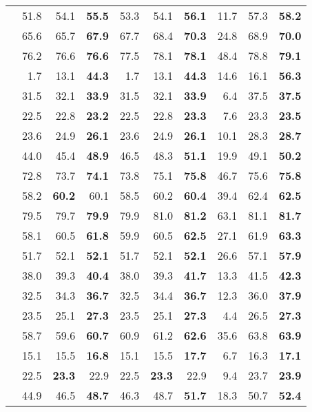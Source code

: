 \begin{table*}[p]
\begin{tabular}{lRRRRRRRRR}
     & 51.8 & 54.1 & \bf{55.5} & 53.3 & 54.1 & \bf{56.1} & 11.7 & 57.3 & \bf{58.2}\\
     & 65.6 & 65.7 & \bf{67.9} & 67.7 & 68.4 & \bf{70.3} & 24.8 & 68.9 & \bf{70.0}\\
     & 76.2 & 76.6 & \bf{76.6} & 77.5 & 78.1 & \bf{78.1} & 48.4 & 78.8 & \bf{79.1}\\
     & 1.7 & 13.1 & \bf{44.3} & 1.7 & 13.1 & \bf{44.3} & 14.6 & 16.1 & \bf{56.3}\\
     & 31.5 & 32.1 & \bf{33.9} & 31.5 & 32.1 & \bf{33.9} & 6.4 & 37.5 & \bf{37.5}\\
     & 22.5 & 22.8 & \bf{23.2} & 22.5 & 22.8 & \bf{23.3} & 7.6 & 23.3 & \bf{23.5}\\
     & 23.6 & 24.9 & \bf{26.1} & 23.6 & 24.9 & \bf{26.1} & 10.1 & 28.3 & \bf{28.7}\\
     & 44.0 & 45.4 & \bf{48.9} & 46.5 & 48.3 & \bf{51.1} & 19.9 & 49.1 & \bf{50.2}\\
     & 72.8 & 73.7 & \bf{74.1} & 73.8 & 75.1 & \bf{75.8} & 46.7 & 75.6 & \bf{75.8}\\
     & 58.2 & \bf{60.2} & 60.1 & 58.5 & 60.2 & \bf{60.4} & 39.4 & 62.4 & \bf{62.5}\\
     & 79.5 & 79.7 & \bf{79.9} & 79.9 & 81.0 & \bf{81.2} & 63.1 & 81.1 & \bf{81.7}\\
     & 58.1 & 60.5 & \bf{61.8} & 59.9 & 60.5 & \bf{62.5} & 27.1 & 61.9 & \bf{63.3}\\
     & 51.7 & 52.1 & \bf{52.1} & 51.7 & 52.1 & \bf{52.1} & 26.6 & 57.1 & \bf{57.9}\\
     & 38.0 & 39.3 & \bf{40.4} & 38.0 & 39.3 & \bf{41.7} & 13.3 & 41.5 & \bf{42.3}\\
     & 32.5 & 34.3 & \bf{36.7} & 32.5 & 34.4 & \bf{36.7} & 12.3 & 36.0 & \bf{37.9}\\
     & 23.5 & 25.1 & \bf{27.3} & 23.5 & 25.1 & \bf{27.3} & 4.4 & 26.5 & \bf{27.3}\\
     & 58.7 & 59.6 & \bf{60.7} & 60.9 & 61.2 & \bf{62.6} & 35.6 & 63.8 & \bf{63.9}\\
     & 15.1 & 15.5 & \bf{16.8} & 15.1 & 15.5 & \bf{17.7} & 6.7 & 16.3 & \bf{17.1}\\
     & 22.5 & \bf{23.3} & 22.9 & 22.5 & \bf{23.3} & 22.9 & 9.4 & 23.7 & \bf{23.9}\\
     & 44.9 & 46.5 & \bf{48.7} & 46.3 & 48.7 & \bf{51.7} & 18.3 & 50.7 & \bf{52.4}\\

\end{tabular}
\end{table*}
